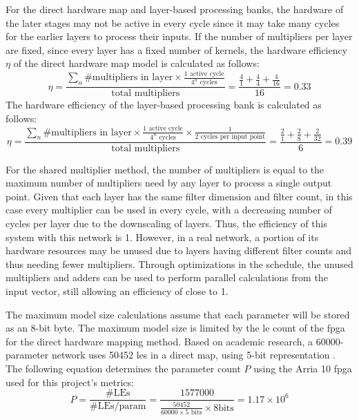 \documentclass{uw-ece-wkrpt}
\begin{document}
For the direct hardware map and layer-based processing banks, the hardware of the later stages may not be active in every cycle since it may take many cycles for the earlier layers to process their inputs. If the number of multipliers per layer are fixed, since every layer has a fixed number of kernels, the hardware efficiency $\eta$ of the direct hardware map model is calculated as follows:
\begin{equation}
    \eta = \frac{\sum_n \text{\# multipliers in layer} \times \frac{1 \text{ active cycle}}{4^n \text{ cycles}}}{\text{total multipliers}} = \frac{\frac{4}{1} + \frac{4}{4} + \frac{4}{16}}{16} = 0.33
\end{equation}
The hardware efficiency of the layer-based processing bank is calculated as follows:
\begin{equation}
    \eta = \frac{\sum_n \text{\# multipliers in layer} \times \frac{1 \text{ active cycle}}{4^n  \text{ cycles}} \times \frac{1}{2 \text{ cycles per input point}}}{\text{total multipliers}} = \frac{\frac{2}{1} + \frac{2}{8} + \frac{2}{32}}{6} = 0.39
\end{equation}

For the shared multiplier method, the number of multipliers is equal to the maximum number of multipliers need by any layer to process a single output point. Given that each layer has the same \gls{filter} dimension and \gls{filter} count, in this case every multiplier can be used in every cycle, with a decreasing number of cycles per layer due to the downscaling of layers. Thus, the efficiency of this system with this network is 1. However, in a real network, a portion of its hardware resources may be unused due to layers having different \gls{filter} counts and thus needing fewer multipliers. Through optimizations in the schedule, the unused multipliers and adders can be used to perform parallel calculations from the input vector, still allowing an efficiency of close to 1.

The maximum model size calculations assume that each parameter will be stored as an 8-bit byte. The maximum model size is limited by the \gls{le} count of the \gls{fpga} for the direct hardware mapping method. Based on academic research, a 60000-parameter network uses 50452 \glspl{le} in a direct map, using 5-bit representation \cite{Abdelouahab2017Hardware-Automa}. The following equation determines the parameter count $P$ using the Arria 10 \gls{fpga} \cite{Intel-Corp.2018IntelR-ArriaR-1} used for this project's metrics:
\begin{equation}
    P = \frac{\text{\# LEs}}{\text{\# LEs/param}} = \frac{1577000}{\frac{50452}{60000 \times 5 \text{ bits}} \times 8 \text{bits}} = 1.17 \times 10^6
\end{equation}
\end{document}
